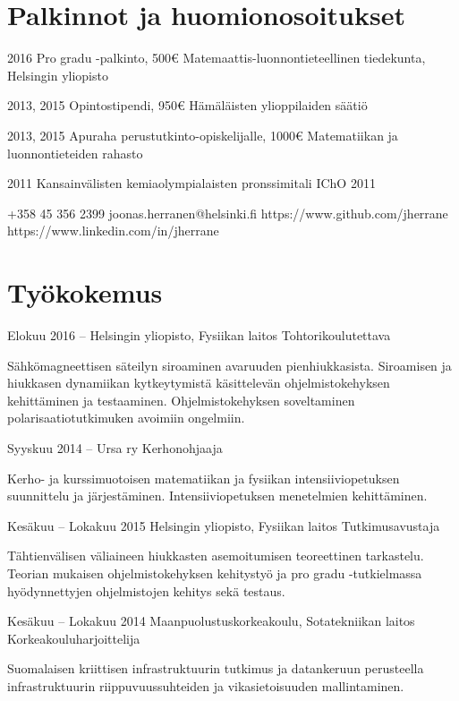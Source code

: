 \documentclass{tccv}
\begin{document}
\section{Palkinnot ja huomionosoitukset}
\begin{yearlist}
	\item{2016}
	{Pro gradu -palkinto, 500€}
	{Matemaattis-luonnontieteellinen tiedekunta, Helsingin yliopisto}
	\item{2013, 2015}
	{Opintostipendi, 950€}
	{Hämäläisten ylioppilaiden säätiö}	
	\item{2013, 2015}
	{Apuraha perustutkinto-opiskelijalle, 1000€}
	{Matematiikan ja luonnontieteiden rahasto}	
	\item{2011}
	{Kansainvälisten kemiaolympialaisten pronssimitali}
	{IChO 2011}	
\end{yearlist}

{+358 45 356 2399}
{joonas.herranen@helsinki.fi}
{https://www.github.com/jherrane}
{https://www.linkedin.com/in/jherrane}

\section{Työkokemus}
\begin{eventlist}	
	\item{Elokuu 2016 -- }
	{Helsingin yliopisto, Fysiikan laitos}
	{Tohtorikoulutettava}
	
	Sähkömagneettisen säteilyn siroaminen avaruuden pienhiukkasista. Siroamisen ja hiukkasen dynamiikan kytkeytymistä käsittelevän ohjelmistokehyksen kehittäminen ja testaaminen. Ohjelmistokehyksen soveltaminen polarisaatiotutkimuken avoimiin ongelmiin.
	
	\item{Syyskuu 2014 --}
	{Ursa ry}
	{Kerhonohjaaja}
	
	Kerho- ja kurssimuotoisen matematiikan ja fysiikan intensiiviopetuksen suunnittelu ja järjestäminen. Intensiiviopetuksen menetelmien kehittäminen. 
	
	\item{Kesäkuu -- Lokakuu 2015}
	{Helsingin yliopisto, Fysiikan laitos}
	{Tutkimusavustaja}
	
	Tähtienvälisen väliaineen hiukkasten asemoitumisen teoreettinen tarkastelu. Teorian mukaisen ohjelmistokehyksen kehitystyö ja pro gradu -tutkielmassa hyödynnettyjen ohjelmistojen kehitys sekä testaus.
	
	\item{Kesäkuu -- Lokakuu 2014}
	{Maanpuolustuskorkeakoulu, Sotatekniikan laitos}
	{Korkeakouluharjoittelija}
	
	Suomalaisen kriittisen infrastruktuurin tutkimus ja da\-tan\-ke\-ruun perusteella infrastruktuurin riippuvuussuhteiden ja vikasietoisuuden mallintaminen.
	
\end{eventlist}
\pagebreak
\end{document}
